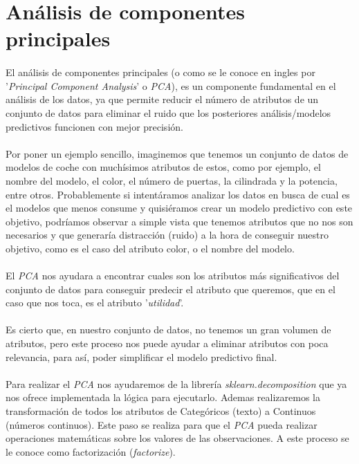 \section{Análisis de componentes principales}
\label{section:pca}

\paragraph{}
El análisis de componentes principales (o como se le conoce en ingles por '\textit{Principal Component Analysis}' o \textit{PCA}), es un componente fundamental en el análisis de los datos, ya que permite reducir el número de atributos de un conjunto de datos para eliminar el ruido que los posteriores análisis/modelos predictivos funcionen con mejor precisión\cite{ref:pca_def}.

\paragraph{}
Por poner un ejemplo sencillo, imaginemos que tenemos un conjunto de datos de modelos de coche con muchísimos atributos de estos, como por ejemplo, el nombre del modelo, el color, el número de puertas, la cilindrada y la potencia, entre otros. Probablemente si intentáramos analizar los datos en busca de cual es el modelos que menos consume y quisiéramos crear un modelo predictivo con este objetivo, podríamos observar a simple vista que tenemos atributos que no nos son necesarios y que generaría distracción (ruido) a la hora de conseguir nuestro objetivo, como es el caso del atributo color, o el nombre del modelo.

\paragraph{}
El \textit{PCA} nos ayudara a encontrar cuales son los atributos más significativos del conjunto de datos para conseguir predecir el atributo que queremos\cite{ref:pca_def}, que en el caso que nos toca, es el atributo '\textit{utilidad}'.

\paragraph{}
Es cierto que, en nuestro conjunto de datos, no tenemos un gran volumen de atributos, pero este proceso nos puede ayudar a eliminar atributos con poca relevancia, para así, poder simplificar el modelo predictivo final.

\paragraph{}
Para realizar el \textit{PCA} nos ayudaremos de la librería \textit{sklearn.decomposition} que ya nos ofrece implementada la lógica para ejecutarlo. Ademas realizaremos la transformación de todos los atributos de Categóricos (texto) a Continuos (números continuos). Este paso se realiza para que el \textit{PCA} pueda realizar operaciones matemáticas sobre los valores de las observaciones. A este proceso se le conoce como factorización (\textit{factorize}). 

